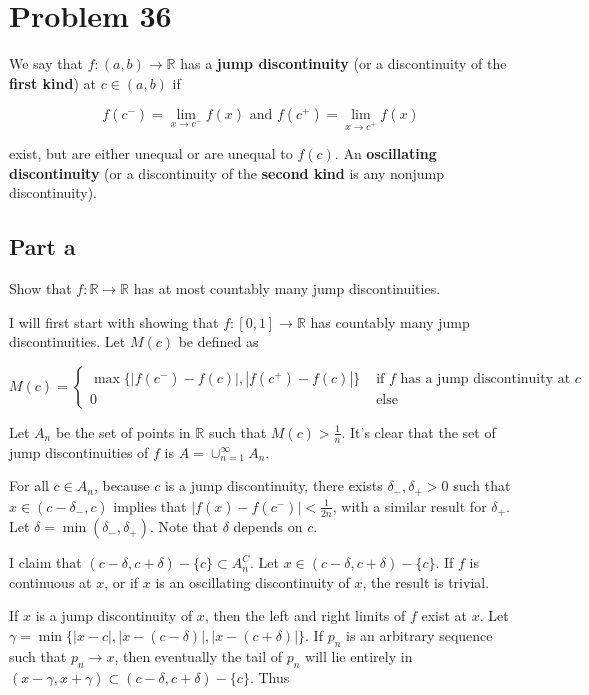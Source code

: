 \documentclass{article}
\newcommand{\R}{\mathbb{R}}
\begin{document}
\section*{Problem 36}

We say that $f: (a, b) \rightarrow \R$ has a \textbf{jump discontinuity} (or a discontinuity of the \textbf{first kind}) at $c \in (a, b)$ if

\[
f(c^-) = \lim_{x \rightarrow c^-} f(x) \text{ and } f(c^+) = \lim_{x \rightarrow c^+} f(x)
\]

exist, but are either unequal or are unequal to $f(c)$. An \textbf{oscillating discontinuity} (or a discontinuity of the \textbf{second kind} is any nonjump discontinuity).

\subsection*{Part a}

Show that $f: \R \rightarrow \R$ has at most countably many jump discontinuities.

I will first start with showing that $f: [0, 1] \rightarrow \R$ has countably many jump discontinuities. Let $M(c)$ be defined as

\[
M(c) =
\begin{cases}
\max\{ |f(c^-) - f(c)|, |f(c^+) - f(c)|\} & \text{ if } f \text{ has a jump discontinuity at } c \\
0 & \text{ else}
\end{cases}
\]

Let $A_n$ be the set of points in $\R$ such that $M(c) > \frac{1}{n}$. It's clear that the set of jump discontinuities of $f$ is $A = \cup_{n=1}^\infty A_n$.

For all $c \in A_n$, because $c$ is a jump discontinuity, there exists $\delta_-, \delta_+ > 0$ such that $x \in (c-\delta_-, c)$ implies that $|f(x) - f(c^-)| < \frac{1}{2n}$, with a similar result for $\delta_+$. Let $\delta = \min (\delta_-, \delta_+)$. Note that $\delta$ depends on $c$.

I claim that $(c - \delta, c + \delta) - \{c\} \subset A_n^C$. Let $x \in (c - \delta, c + \delta) - \{c\}$. If $f$ is continuous at $x$, or if $x$ is an oscillating discontinuity of $x$, the result is trivial.

If $x$ is a jump discontinuity of $x$, then the left and right limits of $f$ exist at $x$. Let $\gamma = \min\{|x-c|, |x - (c-\delta)|, |x-(c+\delta)| \}$. If $p_n$ is an arbitrary sequence such that $p_n \rightarrow x$, then eventually the tail of $p_n$ will lie entirely in $(x-\gamma, x+\gamma) \subset (c - \delta, c + \delta) - \{c\}$. Thus
\end{document}
